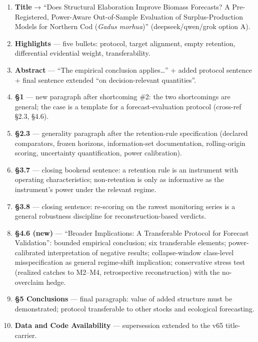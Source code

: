 \documentclass[11pt]{article}
\providecommand{\tightlist}{\setlength{\itemsep}{0.2em}\setlength{\parskip}{0pt}}
\begin{document}
\begin{enumerate}
\def\labelenumi{\arabic{enumi}.}
\tightlist
\item
  \textbf{Title} → ``Does Structural Elaboration Improve Biomass
  Forecasts? A Pre-Registered, Power-Aware Out-of-Sample Evaluation of
  Surplus-Production Models for Northern Cod (\emph{Gadus morhua})''
  (deepseek/qwen/grok option A).
\item
  \textbf{Highlights} --- five bullets: protocol, target alignment,
  empty retention, differential evidential weight, transferability.
\item
  \textbf{Abstract} --- ``The empirical conclusion applies\ldots{}'' +
  added protocol sentence + final sentence extended ``on
  decision-relevant quantities''.
\item
  \textbf{§1} --- new paragraph after shortcoming \#2: the two
  shortcomings are general; the case is a template for a
  forecast-evaluation protocol (cross-ref §2.3, §4.6).
\item
  \textbf{§2.3} --- generality paragraph after the retention-rule
  specification (declared comparators, frozen horizons, information-set
  documentation, rolling-origin scoring, uncertainty quantification,
  power calibration).
\item
  \textbf{§3.7} --- closing bookend sentence: a retention rule is an
  instrument with operating characteristics; non-retention is only as
  informative as the instrument's power under the relevant regime.
\item
  \textbf{§3.8} --- closing sentence: re-scoring on the rawest
  monitoring series is a general robustness discipline for
  reconstruction-based verdicts.
\item
  \textbf{§4.6 (new)} --- ``Broader Implications: A Transferable
  Protocol for Forecast Validation'': bounded empirical conclusion; six
  transferable elements; power-calibrated interpretation of negative
  results; collapse-window class-level misspecification as general
  regime-shift implication; conservative stress test (realized catches
  to M2--M4, retrospective reconstruction) with the no-overclaim hedge.
\item
  \textbf{§5 Conclusions} --- final paragraph: value of added structure
  must be demonstrated; protocol transferable to other stocks and
  ecological forecasting.
\item
  \textbf{Data and Code Availability} --- supersession extended to the
  v65 title-carrier.
\end{enumerate}
\end{document}
